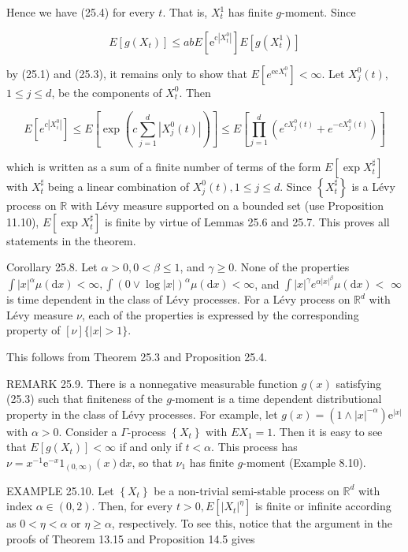 \documentclass[a4paper,12pt]{article}
\begin{document}
Hence we have (25.4) for every $t$. That is, $X_{t}^{1}$ has finite $g$-moment. Since

$$
    E\left[g\left(X_{t}\right)\right] \leq a b E\left[\mathrm{e}^{\mathrm{c}\left|X_{t}^{0}\right|}\right] E\left[g\left(X_{t}^{1}\right)\right]
$$

by (25.1) and (25.3), it remains only to show that $E\left[e^{\mathrm{ec} X_{i}^{0}}\right]<\infty$. Let $X_{j}^{0}(t)$, $1 \leq j \leq d$, be the components of $X_{t}^{0}$. Then

$$
    E\left[e^{c\left|X_{i}^{0}\right|}\right] \leq E\left[\exp \left(c \sum_{j=1}^{d}\left|X_{j}^{0}(t)\right|\right)\right] \leq E\left[\prod_{j=1}^{d}\left(e^{c X_{j}^{0}(t)}+e^{-c X_{j}^{0}(t)}\right)\right]
$$

which is written as a sum of a finite number of terms of the form $E\left[\exp X_{t}^{\sharp}\right]$ with $X_{t}^{\sharp}$ being a linear combination of $X_{j}^{0}(t), 1 \leq j \leq d$. Since $\left\{X_{t}^{\sharp}\right\}$ is a Lévy process on $\mathbb{R}$ with Lévy measure supported on a bounded set (use Proposition 11.10), $E\left[\exp X_{t}^{\sharp}\right]$ is finite by virtue of Lemmas 25.6 and 25.7. This proves all statements in the theorem.

Corollary 25.8. Let $\alpha>0,0<\beta \leq 1$, and $\gamma \geq 0$. None of the properties $\int|x|^{\alpha} \mu(\mathrm{d} x)<\infty, \int(0 \vee \log |x|)^{\alpha} \mu(\mathrm{d} x)<\infty$, and $\int|x|^{\gamma} e^{\alpha|x|^{\beta}} \mu(\mathrm{d} x)<$ $\infty$ is time dependent in the class of Lévy processes. For a Lévy process on $\mathbb{R}^{d}$ with Lévy measure $\nu$, each of the properties is expressed by the corresponding property of $[\nu]\{|x|>1\}$.

This follows from Theorem 25.3 and Proposition 25.4.

REMARK 25.9. There is a nonnegative measurable function $g(x)$ satisfying (25.3) such that finiteness of the $g$-moment is a time dependent distributional property in the class of Lévy processes. For example, let $g(x)=\left(1 \wedge|x|^{-\alpha}\right) \mathrm{e}^{|x|}$ with $\alpha>0$. Consider a $\Gamma$-process $\left\{X_{t}\right\}$ with $E X_{1}=1$. Then it is easy to see that $E\left[g\left(X_{t}\right)\right]<\infty$ if and only if $t<\alpha$. This process has $\nu=x^{-1} \mathrm{e}^{-x} 1_{(0, \infty)}(x) \mathrm{d} x$, so that $\nu_{1}$ has finite $g$-moment (Example 8.10).

EXAMPLE 25.10. Let $\left\{X_{t}\right\}$ be a non-trivial semi-stable process on $\mathbb{R}^{d}$ with index $\alpha \in(0,2)$. Then, for every $t>0, E\left[\left|X_{t}\right|^{\eta}\right]$ is finite or infinite according as $0<\eta<\alpha$ or $\eta \geq \alpha$, respectively. To see this, notice that the argument in the proofs of Theorem 13.15 and Proposition 14.5 gives
\end{document}
